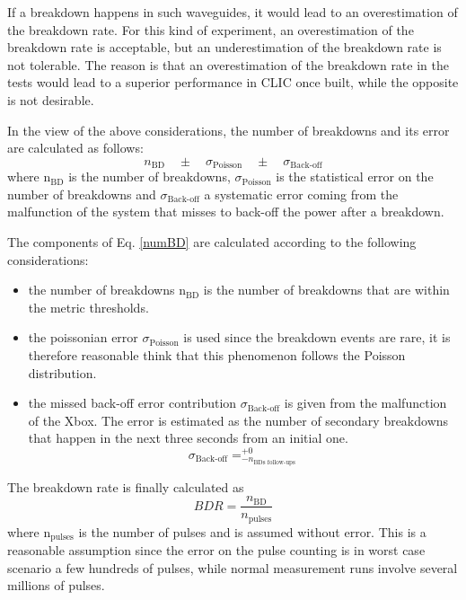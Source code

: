 If a breakdown happens in such waveguides, it would lead to an overestimation of the breakdown rate. For this kind of experiment, an overestimation of the breakdown rate is acceptable, but an underestimation of the breakdown rate is not tolerable. The reason is that an overestimation of the breakdown rate in the tests would lead to a superior performance in CLIC once built, while the opposite is not desirable.   

In the view of the above considerations, the number of breakdowns and its error are calculated as follows:
\begin{equation}
n_{\text{BD}} \quad \pm \quad \sigma_{\text{Poisson}} \quad \pm \quad \sigma_{\text{Back-off}} 
\label{numBD}
\end{equation}
where  n$_{\text{BD}}$ is the number of breakdowns, $\sigma_{\text{Poisson}}$ is the statistical error on the number of breakdowns and $\sigma_{\text{Back-off}}$ a systematic error coming from the malfunction of the system that misses to back-off the power after a breakdown.

The components of Eq. \ref{numBD} are calculated according to the following considerations:
\begin{itemize}
\item the number of breakdowns n$_{\text{BD}}$ is the number of breakdowns that are within the metric thresholds.  
\item the poissonian error $\sigma_{\text{Poisson}}$ is used since the breakdown events are rare, it is therefore reasonable think that this phenomenon follows the Poisson distribution.
\item the missed back-off error contribution $ \sigma_{\text{Back-off}}$ is given from the malfunction of the Xbox. The error is estimated as the number of secondary breakdowns that happen in the next three seconds from an initial one. 
\begin{equation}
\sigma_{\text{Back-off}} = _{- n_{\text{BDs follow-ups}}}^{+ 0}
\end{equation}
\end{itemize}

\noindent
The breakdown rate is finally calculated as
\begin{equation}
BDR = \frac{n_{\text{BD}}}{n_{\text{pulses}}}
\end{equation}
where n$_{\text{pulses}}$ is the number of pulses and is assumed without error. This is a reasonable assumption since the error on the pulse counting is in worst case scenario a few hundreds of pulses, while normal measurement runs involve several millions of pulses.
